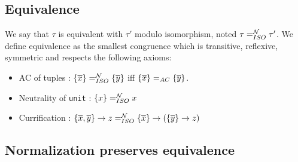\documentclass [a4paper,11pt]{scrartcl}
\newcommand{\N}{{\cal N}}
\newcommand\tlist{\overline}
\newcommand\tmset[1]{\{\overline{#1}\}}
\begin{document}
\subsection{Equivalence}

\newcommand\eqN{=^{\N}_{ISO}}
\newcommand\unifN{\equiv^{\N}_{ISO}}

We say that $\tau$ is equivalent with $\tau'$ modulo isomorphism, noted $\tau \eqN \tau'$. We define
equivalence as the smallest congruence which is transitive, reflexive, symmetric and respects the following axioms:


\begin{itemize}
\item AC of tuples : $\tmset{x} \eqN \tmset{y}$ iff $\tmset{x} \eqAC \tmset{y}$.
\item Neutrality of \texttt{unit} : $\{x\} \eqN x$ 
\item Currification : $\{\tlist{x},\tlist{y}\} \to z \eqN \tmset{x} \to (\tmset{y} \to z)$
\end{itemize}

\subsection{Normalization preserves equivalence}
\end{document}
